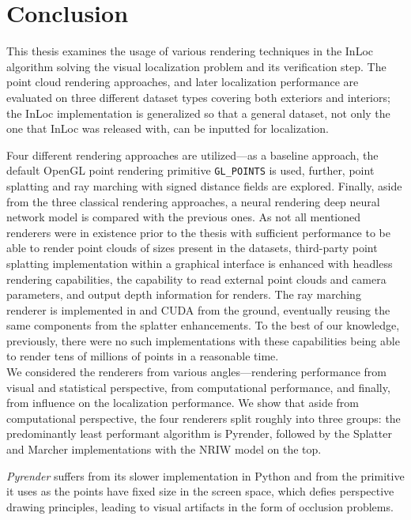 \chapter*{Conclusion} \label{chap:conclusion}

This thesis examines the usage of various rendering techniques in the InLoc
algorithm solving the visual localization problem and its verification step.
The point cloud rendering approaches, and later localization performance are
evaluated on three different dataset types covering both exteriors and
interiors; the InLoc implementation is generalized so that a general dataset,
not only the one that InLoc was released with, can be inputted for localization.

Four different rendering approaches are utilized---as a baseline approach,
the default OpenGL point rendering primitive \verb|GL_POINTS| is used, further,
point splatting and ray marching with signed distance fields are explored.
Finally, aside from the three classical rendering approaches, a neural
rendering deep neural network model is compared with the previous ones. As not
all mentioned renderers were in existence prior to the thesis with sufficient
performance to be able to render point clouds of sizes present in the datasets,
third-party point splatting \CC{} implementation within a graphical interface is
enhanced with headless rendering capabilities, the capability to read external point
clouds and camera parameters, and output depth information for renders. The ray
marching renderer is implemented in \CC{} and CUDA from the ground, eventually
reusing the same components from the splatter enhancements. To the best of our knowledge,
previously, there were no such implementations with these capabilities being able
to render tens of millions of points in a reasonable time.\\

We considered the renderers from various angles---rendering performance from visual
and statistical perspective, from computational performance, and finally, from
influence on the localization performance. We show that aside from computational
perspective, the four renderers split roughly into three groups: the predominantly
least performant algorithm is Pyrender, followed by the Splatter and Marcher
implementations with the NRIW model on the top.

\emph{Pyrender} suffers from its slower
implementation in Python and from the primitive it uses as the points have fixed
size in the screen space, which defies perspective drawing principles, leading to
visual artifacts in the form of occlusion problems.

